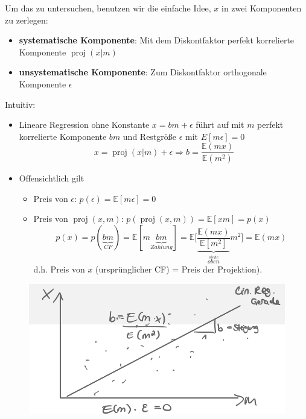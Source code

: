 \documentclass[12pt]{extreport} %
\theoremstyle{named}
\theoremstyle{nnamed}
\theoremstyle{itshape}
\theoremstyle{normal}
\begin{document}
Um das zu untersuchen, benutzen wir die einfache Idee, $x$ in zwei Komponenten zu zerlegen:
\begin{itemize}
	\item \textbf{systematische Komponente}: Mit dem Diskontfaktor perfekt korrelierte Komponente $\operatorname{proj}(x|m)$
	\item \textbf{unsystematische Komponente}: Zum Diskontfaktor orthogonale Komponente $\epsilon$
\end{itemize}

Intuitiv:
\begin{itemize}
	\item Lineare Regression ohne Konstante $x = bm + \epsilon$ führt auf mit $m$ perfekt korrelierte Komponente $bm$ und Restgröße $\epsilon$ mit $E[m\epsilon] = 0$
	$$ x = \operatorname{proj}(x|m) + \epsilon \Rightarrow b = \frac{\mathbb{E}(mx)}{\mathbb{E}(m^2)} $$
	\item Offensichtlich gilt
		\begin{itemize}
			\item Preis von $\epsilon$: $p(\epsilon) = \mathbb{E}[m\epsilon] = 0$
			\item Preis von $\operatorname{proj}(x, m)$: $ p \left(\operatorname{proj}(x, m) \right) = \mathbb{E}[xm] = p(x)$
				$$ p(x) = p(\underbrace{b m}_{CF}) = \mathbb{E}[m\underbrace{bm}_{Zahlung}] = \mathbb{E} \Bigg[ \underbrace{\frac{\mathbb{E}(mx)}{\mathbb{E}[m^2]}}_{\overset{siehe}{oben}} m^2 \Bigg] = \mathbb{E}(mx)$$
				d.h. Preis von $x$ (ursprünglicher CF) = Preis der Projektion).
		\end{itemize}
\end{itemize}

\begin{figure}[h!] \centering
	\includegraphics[scale=0.3]{img/p44}
\end{figure}

\newpage
\end{document}
